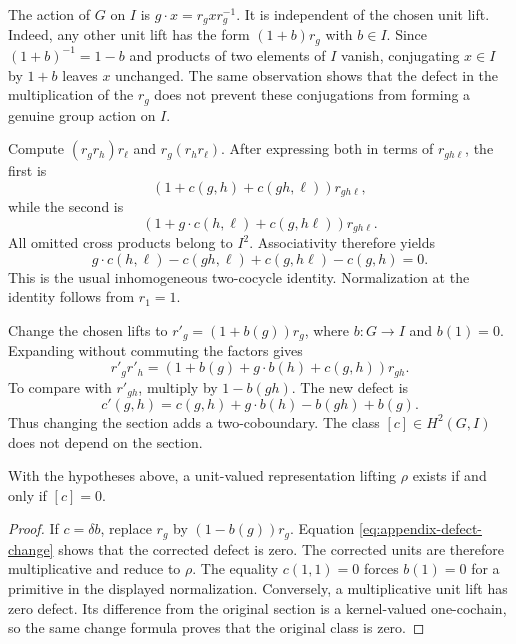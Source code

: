 The action of $G$ on $I$ is $g\cdot x=r_gxr_g^{-1}$. It is independent of
the chosen unit lift. Indeed, any other unit lift has the form $(1+b)r_g$
with $b\in I$. Since $(1+b)^{-1}=1-b$ and products of two elements of $I$
vanish, conjugating $x\in I$ by $1+b$ leaves $x$ unchanged. The same
observation shows that the defect in the multiplication of the $r_g$ does
not prevent these conjugations from forming a genuine group action on $I$.

Compute $(r_gr_h)r_\ell$ and $r_g(r_hr_\ell)$. After expressing both in
terms of $r_{gh\ell}$, the first is
\[
 (1+c(g,h)+c(gh,\ell))r_{gh\ell},
\]
while the second is
\[
 (1+g\cdot c(h,\ell)+c(g,h\ell))r_{gh\ell}.
\]
All omitted cross products belong to $I^2$. Associativity therefore yields
\begin{equation}
 g\cdot c(h,\ell)-c(gh,\ell)+c(g,h\ell)-c(g,h)=0.
 \label{eq:appendix-cocycle}
\end{equation}
This is the usual inhomogeneous two-cocycle identity. Normalization at the
identity follows from $r_1=1$.

Change the chosen lifts to $r'_g=(1+b(g))r_g$, where $b:G\to I$ and
$b(1)=0$. Expanding without commuting the factors gives
\[
 r'_gr'_h
 =(1+b(g)+g\cdot b(h)+c(g,h))r_{gh}.
\]
To compare with $r'_{gh}$, multiply by $1-b(gh)$. The new defect is
\begin{equation}
 c'(g,h)=c(g,h)+g\cdot b(h)-b(gh)+b(g).
 \label{eq:appendix-defect-change}
\end{equation}
Thus changing the section adds a two-coboundary. The class $[c]\in H^2(G,I)$
does not depend on the section.

\begin{proposition}
With the hypotheses above, a unit-valued representation lifting $\rho$
exists if and only if $[c]=0$.
\end{proposition}

\begin{proof}
If $c=\delta b$, replace $r_g$ by $(1-b(g))r_g$. Equation
\eqref{eq:appendix-defect-change} shows that the corrected defect is zero.
The corrected units are therefore multiplicative and reduce to $\rho$.
The equality $c(1,1)=0$ forces $b(1)=0$ for a primitive in the displayed
normalization. Conversely, a multiplicative unit lift has zero defect.
Its difference from the original section is a kernel-valued one-cochain,
so the same change formula proves that the original class is zero.
\end{proof}

